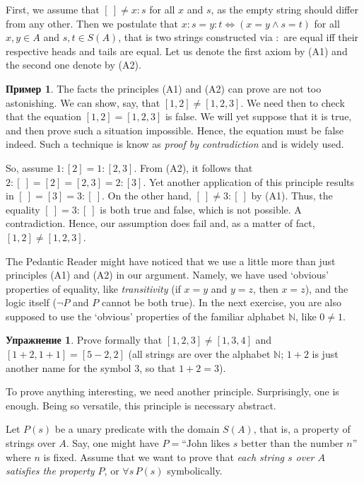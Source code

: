 \documentclass[12pt,notitlepage]{article}
\theoremstyle{plain}
\theoremstyle{definition}
\newtheorem{exc}[thm]{Упражнение}
\newtheorem{exm}[thm]{Пример}
\theoremstyle{plain}
\newcommand{\N}{\mathbb{N}}
\newcommand{\1}{\mathbf{1}}
\newcommand{\0}{\mathbf{0}}
\begin{document}
First, we assume that $[\ ] \neq x : s$ for all $x$ and $s$, as the empty string should differ from any other. Then we postulate that $x : s = y : t \iff (x = y \wedge s = t)$ for all $x, y \in A$ and $s, t \in S(A)$, that is two strings constructed via $:$ are equal iff their respective heads and tails are equal. Let us denote the first axiom by (A1) and the second one denote by (A2).

\begin{exm}
	The facts the principles (A1) and (A2) can prove are not too astonishing. We can show, say, that $[1,2] \neq [1,2,3]$. We need then to check that the equation $[1,2] = [1,2,3]$ is false. We will yet suppose that it is true, and then prove such a situation impossible. Hence, the equation must be false indeed. Such a technique is know as \emph{proof by contradiction} and is widely used.
	
	So, assume  $1:[2] = 1:[2,3]$. From (A2), it follows that $2 : [\ ] = [2] = [2,3] = 2 : [3]$. Yet another application of this principle results in $[\ ] = [3] = 3 : [\ ]$. On the other hand, $[\ ] \neq 3 : [\ ]$ by (A1). Thus, the equality $[\ ] = 3 : [\ ]$ is both true and false, which is not possible. A contradiction. Hence, our assumption does fail and, as a matter of fact, $[1,2] \neq [1,2,3]$.
	
	The Pedantic Reader might have noticed that we use a little more than just principles (A1) and (A2) in our argument. Namely, we have used `obvious' properties of equality, like \emph{transitivity} (if $x = y$ and $y = z$, then $x = z$), and the logic itself ($\neg P$ and $P$ cannot be both true). In the next exercise, you are also supposed to use the `obvious' properties of the familiar alphabet $\N$, like $0 \neq 1$.
\end{exm}

\begin{exc}
	Prove formally that $[1,2,3] \neq [1,3,4]$ and $[1 + 2, 1 + 1] = [5 - 2, 2]$ (all strings are over the alphabet $\N$; $1 + 2$ is just another name for the symbol $3$, so that $1 + 2 = 3$).
\end{exc}

To prove anything interesting, we need another principle. Surprisingly, one is enough. Being so versatile, this principle is necessary abstract.

Let $P(s)$ be a unary predicate with the domain $S(A)$, that is, a property of strings over $A$. Say, one might have $P = \mbox{``John likes $s$ better than the number $n$''}$ where $n$ is fixed. Assume that we want to prove that \emph{each string $s$ over $A$ satisfies the property $P$}, or $\forall s\, P(s)$ symbolically.
\end{document}
